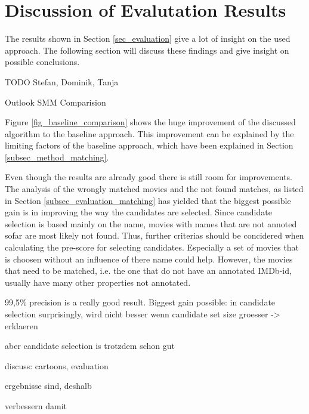 \section{Discussion of Evalutation Results}
\label{sec_discussion}

The results shown in Section \ref{sec_evaluation} give a lot of insight on the used approach.
The following section will discuss these findings and give insight on possible conclusions.

TODO Stefan, Dominik, Tanja

Outlook SMM Comparision

Figure \ref{fig_baseline_comparison} shows the huge improvement of the discussed algorithm to the baseline approach.
This improvement can be explained by the limiting factors of the baseline approach, which have been explained in Section \ref{subsec_method_matching}.

Even though the results are already good there is still room for improvements.
The analysis of the wrongly matched movies and the not found matches, as listed in Section \ref{subsec_evaluation_matching} has yielded that the biggest possible gain is in improving the way the candidates are selected.
Since candidate selection is based mainly on the name, movies with names that are not annoted sofar are most likely not found.
Thus, further criterias should be concidered when calculating the pre-score for selecting candidates.
Especially a set of movies that is choosen without an influence of there name could help.
However, the movies that need to be matched, i.e. the one that do not have an annotated IMDb-id, usually have many other properties not annotated.

99,5\% precision is a really good result.
Biggest gain possible: in candidate selection
surprisingly, wird nicht besser wenn candidate set size groesser -> erklaeren

aber candidate selection is trotzdem schon gut

discuss: cartoons, evaluation

ergebnisse sind, deshalb

verbessern damit

